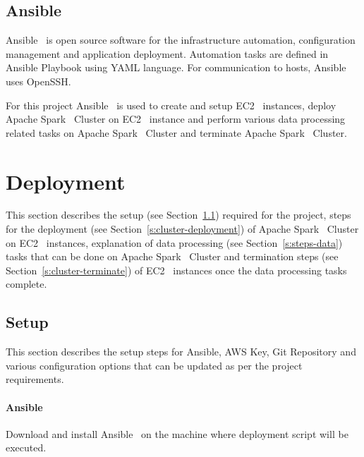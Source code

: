 \subsection{Ansible}\label{S:ansible}

Ansible~\cite{hid-sp18-511-www-ansible} is open source software for
the infrastructure automation, configuration management and
application deployment. Automation tasks are defined in Ansible
Playbook using YAML language. For communication to hosts,
Ansible~\cite{hid-sp18-511-www-ansible} uses OpenSSH\@.

For this project Ansible~\cite{hid-sp18-511-www-ansible} is used to
create and setup EC2~\cite{hid-sp18-511-www-ec2} instances, deploy
Apache Spark~\cite{hid-sp18-511-www-spark} Cluster on
EC2~\cite{hid-sp18-511-www-ec2} instance and perform various data
processing related tasks on Apache Spark~\cite{hid-sp18-511-www-spark}
Cluster and terminate Apache Spark~\cite{hid-sp18-511-www-spark}
Cluster.

\section{Deployment}

This section describes the setup (see Section~\ref{s:setup}) required
for the project, steps for the deployment (see
Section~\ref{s:cluster-deployment}) of Apache
Spark~\cite{hid-sp18-511-www-spark} Cluster on
EC2~\cite{hid-sp18-511-www-ec2} instances, explanation of data
processing (see Section~\ref{s:steps-data}) tasks that can be
done on Apache Spark~\cite{hid-sp18-511-www-spark} Cluster and
termination steps (see Section~\ref{s:cluster-terminate}) of
EC2~\cite{hid-sp18-511-www-ec2} instances once the data processing
tasks complete.

\subsection{Setup}\label{s:setup}

This section describes the setup steps for Ansible, AWS Key, Git
Repository and various configuration options that can be updated as
per the project requirements.


\paragraph{Ansible}
Download and install Ansible~\cite{hid-sp18-511-www-ansible} on the
machine where deployment script will be executed.

